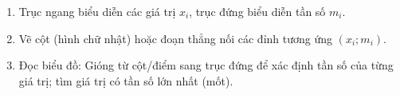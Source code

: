 \begin{enumerate}
\item Trục ngang biểu diễn các giá trị $x_i$, trục đứng biểu diễn tần số $m_i$.
\item Vẽ cột (hình chữ nhật) hoặc đoạn thẳng nối các đỉnh tương ứng $(x_i; m_i)$.
\item Đọc biểu đồ: Gióng từ cột/điểm sang trục đứng để xác định tần số của từng giá trị; tìm giá trị có tần số lớn nhất (mốt).
\end{enumerate}
